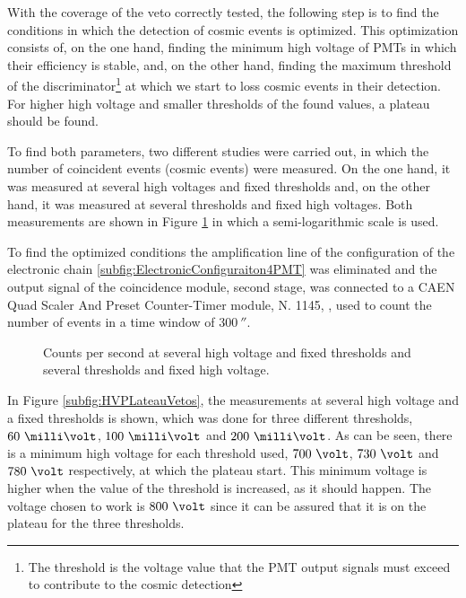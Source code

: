 With the coverage of the veto correctly tested, the following step is to find the conditions in which the detection of cosmic events is optimized. This optimization consists of, on the one hand, finding the minimum high voltage of PMTs in which their efficiency is stable, and, on the other hand, finding the maximum threshold of the discriminator\footnote{The threshold is the voltage value that the PMT output signals must exceed to contribute to the cosmic detection} at which we start to loss cosmic events in their detection. For higher high voltage and smaller thresholds of the found values, a plateau should be found.

To find both parameters, two different studies were carried out, in which the number of coincident events (cosmic events) were measured. On the one hand, it was measured at several high voltages and fixed thresholds and, on the other hand, it was measured at several thresholds and fixed high voltages. Both measurements are shown in Figure \ref{fig:HVandThresholdsPLateaus} in which a semi-logarithmic scale is used.

To find the optimized conditions the amplification line of the configuration of the electronic chain \ref{subfig:ElectronicConfiguraiton4PMT} was eliminated and the output signal of the coincidence module, second stage, was connected to a CAEN Quad Scaler And Preset Counter-Timer module, N. 1145, \cite{ScalerDataSheet}, used to count the number of events in a time window of $300~\second$.

\begin{figure}[]
 \centering
    \newline
 \caption{Counts per second at several high voltage and fixed thresholds and several thresholds and fixed high voltage.}
 \label{fig:HVandThresholdsPLateaus}
\end{figure}

In Figure \ref{subfig:HVPLateauVetos}, the measurements at several high voltage and a fixed thresholds is shown, which was done for three different thresholds, $60~\milli\volt$, $100~\milli\volt$ and $200~\milli\volt$. As can be seen, there is a minimum high voltage for each threshold used, $700~\volt$, $730~\volt$ and $780~\volt$ respectively, at which the plateau start. This minimum voltage is higher when the value of the threshold is increased, as it should happen. The voltage chosen to work is $800~\volt$ since it can be assured that it is on the plateau for the three thresholds.

